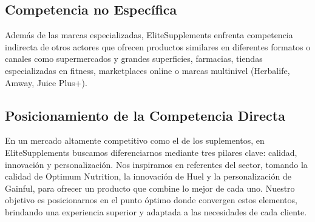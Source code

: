 \documentclass[11pt,a4paper]{report}
\begin{document}
\subsection{Competencia no Específica}

Además de las marcas especializadas, EliteSupplements enfrenta competencia indirecta de otros actores que ofrecen productos similares en diferentes formatos o canales como supermercados y grandes superficies, farmacias, tiendas especializadas en fitness, marketplaces online o marcas multinivel (Herbalife, Amway, Juice Plus+).

\subsection{Posicionamiento de la Competencia Directa}
En un mercado altamente competitivo como el de los suplementos, en EliteSupplements buscamos diferenciarnos mediante tres pilares clave: calidad, innovación y personalización. Nos inspiramos en referentes del sector, tomando la calidad de Optimum Nutrition, la innovación de Huel y la personalización de Gainful, para ofrecer un producto que combine lo mejor de cada uno. Nuestro objetivo es posicionarnos en el punto óptimo donde convergen estos elementos, brindando una experiencia superior y adaptada a las necesidades de cada cliente.

\vspace{1CM}
\end{document}
